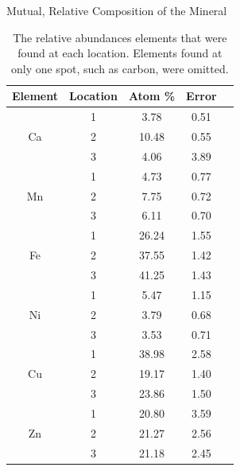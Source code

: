 \documentclass[10pt]{IEEEtran}
\begin{document}
\begin{table}[!hpbt]
      \begin{center}
        \normalsize{Mutual, Relative Composition of the Mineral}
        \begin{tabular}{|c|c|c|c|c|}	
		   \hline        	
		   Element & Location & Atom \% & Error \\
            \hline
            \multirow{3}{*}{Ca} & 1 & 3.78 & 0.51 \\
            \hhline{~----}
	        & 2 & 10.48 & 0.55 \\
	        \hhline{~----}
	        & 3 & 4.06 & 3.89 \\
	        \hline
            \multirow{3}{*}{Mn} & 1 & 4.73 & 0.77 \\
            \hhline{~----}
            & 2 & 7.75 & 0.72 \\
            \hhline{~----}
	        & 3 & 6.11 & 0.70 \\	      
	        \hline  
            \multirow{3}{*}{Fe} & 1 & 26.24 & 1.55 \\
            \hhline{~----}
            & 2 & 37.55 & 1.42 \\
            \hhline{~----}
            & 3 & 41.25 & 1.43 \\
            \hline
            \multirow{3}{*}{Ni} & 1 & 5.47 & 1.15 \\
            \hhline{~----}
            & 2 & 3.79 & 0.68 \\
            \hhline{~----}
            & 3 & 3.53 & 0.71 \\
            \hline
            \multirow{3}{*}{Cu} & 1 & 38.98 & 2.58 \\
            \hhline{~----}
            & 2 & 19.17 & 1.40 \\
            \hhline{~----}
            & 3 & 23.86 & 1.50 \\
            \hline
            \multirow{3}{*}{Zn} & 1 & 20.80 & 3.59 \\
            \hhline{~----}
            & 2 & 21.27 & 2.56 \\
            \hhline{~----}
            & 3 & 21.18 & 2.45 \\
            \hline
       \end{tabular}
       \caption{The relative abundances elements that were found at each location. Elements found at only one spot, such as carbon, were omitted.}
       \label{tab:object4}
      \end{center}
    \end{table}    
    
\end{document}
